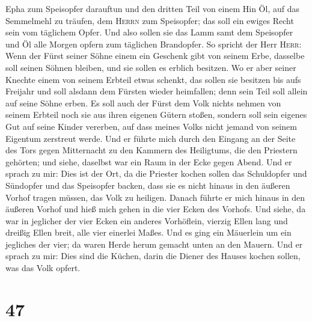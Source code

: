 Epha zum Speisopfer darauftun und den dritten Teil von einem Hin Öl, auf
das Semmelmehl zu träufen, dem \textsc{Herrn} zum Speisopfer; das soll
ein ewiges Recht sein vom täglichem Opfer.  Und also
sollen sie das Lamm samt dem Speisopfer und Öl alle Morgen opfern zum
täglichen Brandopfer.  So spricht der Herr \textsc{Herr}:
Wenn der Fürst seiner Söhne einem ein Geschenk gibt von seinem Erbe,
dasselbe soll seinen Söhnen bleiben, und sie sollen es erblich besitzen.
 Wo er aber seiner Knechte einem von seinem Erbteil etwas
schenkt, das sollen sie besitzen bis aufs Freijahr und soll alsdann dem
Fürsten wieder heimfallen; denn sein Teil soll allein auf seine Söhne
erben.  Es soll auch der Fürst dem Volk nichts nehmen von
seinem Erbteil noch sie aus ihren eigenen Gütern stoßen, sondern soll
sein eigenes Gut auf seine Kinder vererben, auf dass meines Volks nicht
jemand von seinem Eigentum zerstreut werde.  Und er
führte mich durch den Eingang an der Seite des Tors gegen Mitternacht zu
den Kammern des Heiligtums, die den Priestern gehörten; und siehe,
daselbst war ein Raum in der Ecke gegen Abend.  Und er
sprach zu mir: Dies ist der Ort, da die Priester kochen sollen das
Schuldopfer und Sündopfer und das Speisopfer backen, dass sie es nicht
hinaus in den äußeren Vorhof tragen müssen, das Volk zu heiligen.
 Danach führte er mich hinaus in den äußeren Vorhof und
hieß mich gehen in die vier Ecken des Vorhofs.  Und
siehe, da war in jeglicher der vier Ecken ein anderes Vorhöflein,
vierzig Ellen lang und dreißig Ellen breit, alle vier einerlei Maßes.
 Und es ging ein Mäuerlein um ein jegliches der vier; da
waren Herde herum gemacht unten an den Mauern.  Und er
sprach zu mir: Dies sind die Küchen, darin die Diener des Hauses kochen
sollen, was das Volk opfert.

\hypertarget{section-46}{%
\section{47}\label{section-46}}

